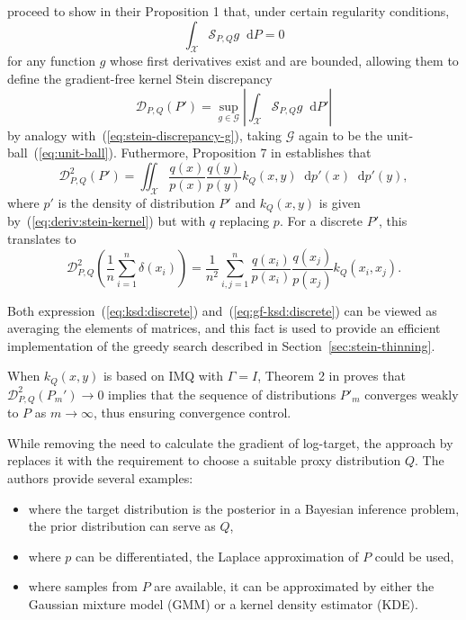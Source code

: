 \documentclass[11pt,a4paper]{report}
\newcommand*\diff{\mathop{}\!\mathrm{d}}
\begin{document}
\cite{fisherGradientFreeKernelStein2024} proceed to show in their Proposition 1 that, under certain regularity conditions,
\begin{equation*}
\int_\mathcal{X} \mathcal{S}_{P,Q} g \diff P = 0
\end{equation*}
for any function $g$ whose first derivatives exist and are bounded, allowing them to define the gradient-free kernel Stein discrepancy
\begin{equation*}
\mathcal{D}_{P, Q}(P') = \sup_{g \in \mathcal{G}}\left|\int_\mathcal{X} \mathcal{S}_{P,Q} g \diff P' \right|
\end{equation*}
by analogy with~(\ref{eq:stein-discrepancy-g}), taking $\mathcal{G}$ again to be the unit-ball~(\ref{eq:unit-ball}). Futhermore, Proposition 7 in \cite{fisherGradientFreeKernelStein2024} establishes that
\begin{equation*}
\mathcal{D}_{P, Q}^2(P') = \iint_\mathcal{X} \frac{q(x)}{p(x)} \frac{q(y)}{p(y)} k_Q(x, y) \diff p'(x) \diff p'(y),
\label{eq:gf-ksd:int}
\end{equation*}
where $p'$ is the density of distribution $P'$ and $k_Q(x, y)$ is given by~(\ref{eq:deriv:stein-kernel}) but with $q$ replacing $p$. For a discrete $P'$, this translates to
\begin{equation}
\mathcal{D}_{P, Q}^2\left(\frac{1}{n} \sum_{i=1}^n \delta(x_i)\right) = \frac{1}{n^2} \sum_{i,j=1}^n \frac{q(x_i)}{p(x_i)} \frac{q(x_j)}{p(x_j)} k_Q(x_i, x_j).
\label{eq:gf-ksd:discrete}
\end{equation}

Both expression~(\ref{eq:ksd:discrete}) and~(\ref{eq:gf-ksd:discrete}) can be viewed as averaging the elements of matrices, and this fact is used to provide an efficient implementation of the greedy search described in Section~\ref{sec:stein-thinning}.

When $k_Q(x,y)$ is based on IMQ with $\Gamma = I$, Theorem 2 in \cite{fisherGradientFreeKernelStein2024} proves that $\mathcal{D}_{P, Q}^2(P_m') \to 0$ implies that the sequence of distributions $P'_m$ converges weakly to $P$ as $m \to \infty$, thus ensuring convergence control. 

While removing the need to calculate the gradient of log-target, the approach by \cite{fisherGradientFreeKernelStein2024} replaces it with the requirement to choose a suitable proxy distribution $Q$. The authors provide several examples:
\begin{itemize}
\item where the target distribution is the posterior in a Bayesian inference problem, the prior distribution can serve as $Q$,
\item where $p$ can be differentiated, the Laplace approximation of $P$ could be used,
\item where samples from $P$ are available, it can be approximated by either the Gaussian mixture model (GMM) or a kernel density estimator (KDE).
\end{itemize}
\end{document}
